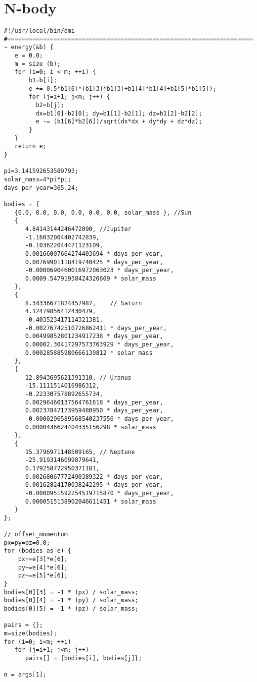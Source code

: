 \section{N-body}
\label{sec:n-body}

\begin{lstlisting}[language=omi]
#!/usr/local/bin/omi
#=======================================================================
~ energy(&b) {
   e = 0.0;
   m = size (b);
   for (i=0; i < m; ++i) {
       b1=b[i]; 
       e += 0.5*b1[6]*(b1[3]*b1[3]+b1[4]*b1[4]+b1[5]*b1[5]);
       for (j=i+1; j<m; j++) {
         b2=b[j];
         dx=b1[0]-b2[0]; dy=b1[1]-b2[1]; dz=b1[2]-b2[2];
         e -= (b1[6]*b2[6])/sqrt(dx*dx + dy*dy + dz*dz);
       }
   }
   return e;
}

pi=3.141592653589793;
solar_mass=4*pi*pi;
days_per_year=365.24;

bodies = {
   {0.0, 0.0, 0.0, 0.0, 0.0, 0.0, solar_mass }, //Sun
   { 
      4.84143144246472090, //Jupiter
      -1.16032004402742839,
      -0.103622044471123109,
      0.00166007664274403694 * days_per_year,
      0.00769901118419740425 * days_per_year,
      -0.0000690460016972063023 * days_per_year,
      0.0009.54791938424326609 * solar_mass
   },
   {
      8.34336671824457987,    // Saturn
      4.12479856412430479,
      -0.403523417114321381,
      -0.00276742510726862411 * days_per_year,
      0.00499852801234917238 * days_per_year,
      0.00002.30417297573763929 * days_per_year,
      0.000285885980666130812 * solar_mass
   },
   {
      12.8943695621391310, // Uranus
      -15.1111514016986312,
      -0.223307578892655734,
      0.00296460137564761618 * days_per_year,
      0.00237847173959480950 * days_per_year,
      -0.0000296589568540237556 * days_per_year,
      0.0000436624404335156298 * solar_mass
   },
   {
      15.3796971148509165, // Neptune
      -25.9193146099879641,
      0.179258772950371181,
      0.00268067772490389322 * days_per_year,
      0.00162824170038242295 * days_per_year,
      -0.0000951592254519715870 * days_per_year,
      0.0000515138902046611451 * solar_mass
   }
};

// offset_momentum
px=py=pz=0.0;
for (bodies as e) {
    px+=e[3]*e[6]; 
    py+=e[4]*e[6]; 
    pz+=e[5]*e[6];
} 
bodies[0][3] = -1 * (px) / solar_mass;
bodies[0][4] = -1 * (py) / solar_mass;
bodies[0][5] = -1 * (pz) / solar_mass;

pairs = {};
m=size(bodies);
for (i=0; i<m; ++i) 
   for (j=i+1; j<m; j++) 
      pairs[] = {bodies[i], bodies[j]};

n = args[1];


\end{lstlisting}
